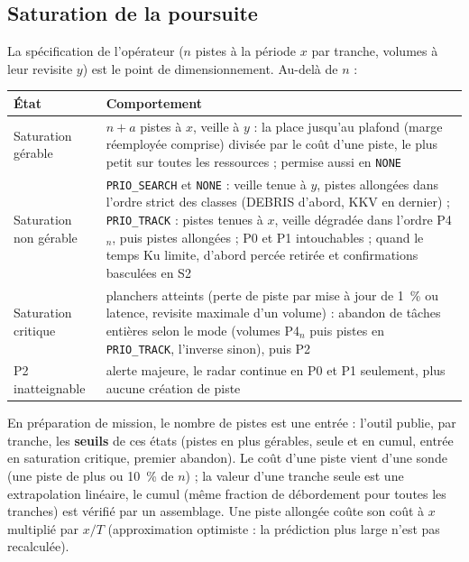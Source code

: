 \documentclass[11pt,a4paper]{article}
\newcommand{\code}[1]{\texttt{\small #1}}
\begin{document}
\subsection{Saturation de la poursuite}
La spécification de l'opérateur ($n$ pistes à la période $x$ par tranche, volumes à leur revisite $y$) est le point de
dimensionnement. Au-delà de $n$ :
\begin{center}
{\small\begin{tabularx}{\linewidth}{@{}lL@{}}
\toprule
État & Comportement\\
\midrule
Saturation gérable & $n+a$ pistes à $x$, veille à $y$ : la place jusqu'au plafond (marge réemployée comprise) divisée
par le coût d'une piste, le plus petit sur toutes les ressources ; permise aussi en \code{NONE}\\
Saturation non gérable & \code{PRIO\_SEARCH} et \code{NONE} : veille tenue à $y$, pistes allongées dans l'ordre strict
des classes (DEBRIS d'abord, KKV en dernier) ; \code{PRIO\_TRACK} : pistes tenues à $x$, veille dégradée dans l'ordre
P4$_n$, puis pistes allongées ; P0 et P1 intouchables ; quand le temps Ku limite, d'abord percée retirée et
confirmations basculées en S2\\
Saturation critique & planchers atteints (perte de piste par mise à jour de \SI{1}{\percent} ou latence, revisite maximale
d'un volume) : abandon de tâches entières selon le mode (volumes P4$_n$ puis pistes en \code{PRIO\_TRACK}, l'inverse
sinon), puis P2\\
P2 inatteignable & alerte majeure, le radar continue en P0 et P1 seulement, plus aucune création de piste\\
\bottomrule
\end{tabularx}}
\end{center}
En préparation de mission, le nombre de pistes est une entrée : l'outil publie, par tranche, les \textbf{seuils} de
ces états (pistes en plus gérables, seule et en cumul, entrée en saturation critique, premier abandon). Le coût d'une
piste vient d'une sonde (une piste de plus ou \SI{10}{\percent} de $n$) ; la valeur d'une tranche seule est une
extrapolation linéaire, le cumul (même fraction de débordement pour toutes les tranches) est vérifié par un assemblage.
Une piste allongée coûte son coût à $x$ multiplié par $x/T$ (approximation optimiste : la prédiction plus large n'est pas
recalculée).
\end{document}
